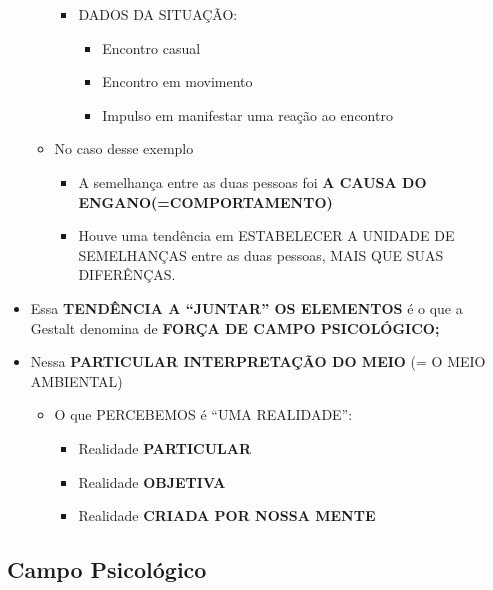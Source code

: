 \documentclass[
]{book}
\providecommand{\tightlist}{%
  \setlength{\itemsep}{0pt}\setlength{\parskip}{0pt}}
\begin{document}
\begin{itemize}
\begin{itemize}
    \begin{itemize}
    \tightlist
    \item
      DADOS DA SITUAÇÃO:

      \begin{itemize}
      \tightlist
      \item
        Encontro casual
      \item
        Encontro em movimento
      \item
        Impulso em manifestar uma reação ao encontro
      \end{itemize}
    \end{itemize}
  \item
    No caso desse exemplo

    \begin{itemize}
    \tightlist
    \item
      A semelhança entre as duas pessoas foi \textbf{A CAUSA DO ENGANO(=COMPORTAMENTO)}
    \item
      Houve uma tendência em ESTABELECER A UNIDADE DE SEMELHANÇAS entre as duas pessoas, MAIS QUE SUAS DIFERÊNÇAS.
    \end{itemize}
  \end{itemize}
\item
  Essa \textbf{TENDÊNCIA A ``JUNTAR'' OS ELEMENTOS} é o que a Gestalt denomina de \textbf{FORÇA DE CAMPO PSICOLÓGICO;}
\item
  Nessa \textbf{PARTICULAR INTERPRETAÇÃO DO MEIO} (= O MEIO AMBIENTAL)

  \begin{itemize}
  \tightlist
  \item
    O que PERCEBEMOS é ``UMA REALIDADE'':

    \begin{itemize}
    \tightlist
    \item
      Realidade \textbf{PARTICULAR}
    \item
      Realidade \textbf{OBJETIVA}
    \item
      Realidade \textbf{CRIADA POR NOSSA MENTE}
    \end{itemize}
  \end{itemize}
\end{itemize}

\hypertarget{campo-psicoluxf3gico}{%
\subsection{Campo Psicológico}\label{campo-psicoluxf3gico}}
\end{document}
